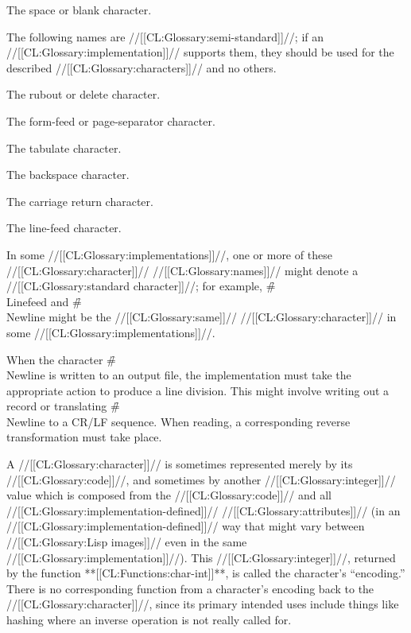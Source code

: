 The space or blank character. \endlist

The following names are //[[CL:Glossary:semi-standard]]//;  if an //[[CL:Glossary:implementation]]// supports them, they should be used for the described //[[CL:Glossary:characters]]// and no others.

\beginlist          {}

The rubout or delete character.


The form-feed or page-separator character.


The tabulate character.


The backspace character.


The carriage return character.


The line-feed character. \endlist

In some //[[CL:Glossary:implementations]]//, one or more of these //[[CL:Glossary:character]]// //[[CL:Glossary:names]]//  might denote a //[[CL:Glossary:standard character]]//;  for example, \f{\#\\Linefeed} and \f{\#\\Newline} might be the //[[CL:Glossary:same]]// //[[CL:Glossary:character]]// in some //[[CL:Glossary:implementations]]//.

\endsubsection%

 

When the character \f{\#\\Newline} is written to an output file, the implementation must take the appropriate action to produce a line division.  This might involve writing out a record or translating \f{\#\\Newline} to a CR/LF sequence. When reading, a corresponding reverse transformation must take place.

\endsubSection%

 


A //[[CL:Glossary:character]]// is sometimes represented merely by its //[[CL:Glossary:code]]//, and sometimes by another //[[CL:Glossary:integer]]// value which is composed from the //[[CL:Glossary:code]]// and all  //[[CL:Glossary:implementation-defined]]// //[[CL:Glossary:attributes]]// (in an //[[CL:Glossary:implementation-defined]]// way that might vary between //[[CL:Glossary:Lisp images]]// even in the same //[[CL:Glossary:implementation]]//). This //[[CL:Glossary:integer]]//, returned by the function **[[CL:Functions:char-int]]**, is called the character's ``encoding.'' There is no corresponding function from a character's encoding back to the //[[CL:Glossary:character]]//,  since its primary intended uses include things like hashing where an inverse operation is not really called for.

